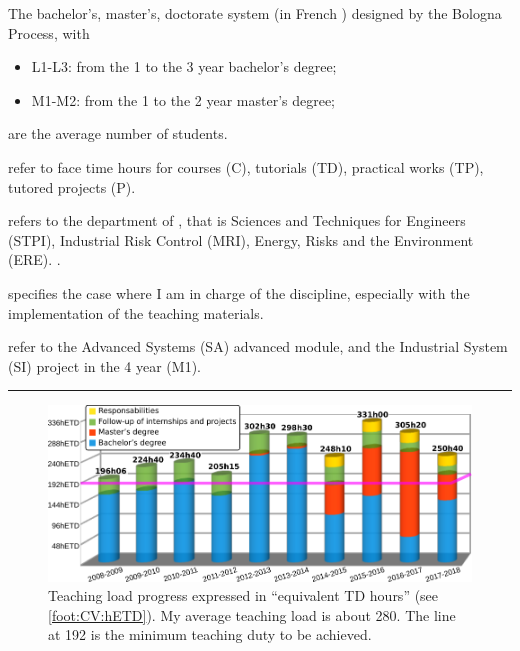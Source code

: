 \begin{table}[tb]
\begin{flushleft}\footnotesize\footnoterule
\begin{description}[format=\sffamily]
  \item[LMD] The bachelor's, master's, doctorate system (in French ) designed by the Bologna Process, with 
  \begin{itemize}
    \item L1-L3: from the 1 to the 3 year bachelor's degree;
    \item M1-M2: from the 1 to the 2 year master's degree;
  \end{itemize}
  \item[Students] are the average number of students.
  \item[C, TD, TP, P] refer to face time hours for courses (C), tutorials (TD), practical works (TP), tutored projects (P).
  \item[Dept.] refers to the department of \INSA \CVL, that is
  Sciences and Techniques for Engineers (STPI),
  Industrial Risk Control (MRI),
  Energy, Risks and the Environment (ERE). .
  \item[Resp.] specifies the case where I am in charge of the discipline, especially with the implementation of the teaching materials.
  \item[SA and SI projects] refer to the Advanced Systems (SA) advanced module, and the Industrial System (SI) project  in the 4 year (M1).
\end{description}
\hrule
\end{flushleft}
\end{table}
%
\begin{figure}[tbh]
  \centering
  \includegraphics[scale=1]{fig/appendixCV/teaching_charge} %
  \caption[Teaching load progress]{Teaching load progress expressed in \enquote{equivalent TD hours}  (see \autoref{foot:CV:hETD}).
   My average teaching load is about \SI{280}{\hETD}.
  The line at \SI{192}{\hETD} is the minimum  teaching duty to be achieved.}
  \label{fig:teaching_charge}
\end{figure}

